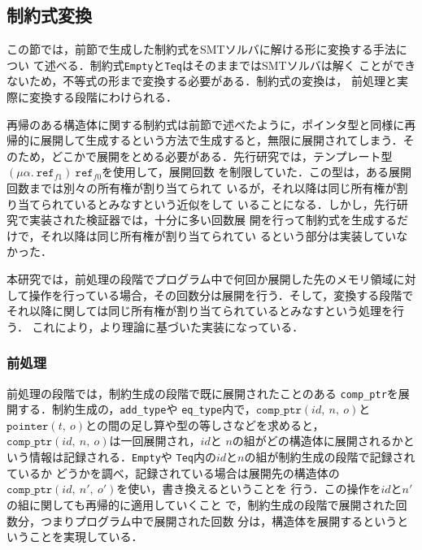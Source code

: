 \subsection{制約式変換}
この節では，前節で生成した制約式をSMTソルバに解ける形に変換する手法につい
て述べる．制約式\texttt{Empty}と\texttt{Teq}はそのままではSMTソルバは解く
ことができないため，不等式の形まで変換する必要がある．制約式の変換は，
前処理と実際に変換する段階にわけられる．

再帰のある構造体に関する制約式は前節で述べたように，ポインタ型と同様に再
帰的に展開して生成するという方法で生成すると，無限に展開されてしまう．そ
のため，どこかで展開をとめる必要がある．先行研究では，テンプレート型
$(\mu\alpha.\ \texttt{ref}_{f1})\ \texttt{ref}_{f0}$を使用して，展開回数
を制限していた．この型は，ある展開回数までは別々の所有権が割り当てられて
いるが，それ以降は同じ所有権が割り当てられているとみなすという近似をして
いることになる．しかし，先行研究で実装された検証器では，十分に多い回数展
開を行って制約式を生成するだけで，それ以降は同じ所有権が割り当てられてい
るという部分は実装していなかった．

本研究では，前処理の段階でプログラム中で何回か展開した先のメモリ領域に対
して操作を行っている場合，その回数分は展開を行う．そして，変換する段階で
それ以降に関しては同じ所有権が割り当てられているとみなすという処理を行う．
これにより，より理論に基づいた実装になっている．


\subsubsection{前処理}
前処理の段階では，制約生成の段階で既に展開されたことのある
\texttt{comp\_ptr}を展開する．制約生成の，\texttt{add\_type}や
\texttt{eq\_type}内で，$\texttt{comp\_ptr}(\mathit{id},\ n,\ o)$と
$\texttt{pointer}(t,\ o)$との間の足し算や型の等しさなどを求めると，
$\texttt{comp\_ptr}(\mathit{id},\ n,\ o)$は一回展開され，$\mathit{id}$と
$n$の組がどの構造体に展開されるかという情報は記録される．\texttt{Empty}や
\texttt{Teq}内の$\mathit{id}$と$n$の組が制約生成の段階で記録されているか
どうかを調べ，記録されている場合は展開先の構造体の
$\texttt{comp\_ptr}(\mathit{id},\ n',\ o')$を使い，書き換えるということを
行う．この操作を$\mathit{id}$と$n'$の組に関しても再帰的に適用していくこと
で，制約生成の段階で展開された回数分，つまりプログラム中で展開された回数
分は，構造体を展開するというということを実現している．

